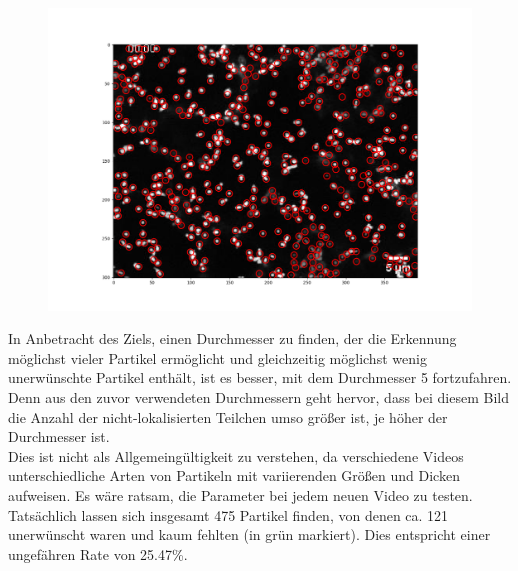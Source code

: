 \begin{enumerate}
\begin{figure}[H]
	\begin{minipage}{.5\textwidth}
     	\centering
  	  	\includegraphics[scale=0.3]{Grafiken/trackpyBilder/locate(frames[0], 5)_1.png}
 		 \label{fig:kap3_d=5}
    \end{minipage}
\end{figure}

In Anbetracht des Ziels, einen Durchmesser zu finden, der die Erkennung möglichst vieler Partikel ermöglicht und gleichzeitig möglichst wenig unerwünschte Partikel enthält, ist es besser, mit dem Durchmesser 5 fortzufahren. Denn aus den zuvor verwendeten Durchmessern geht hervor, dass bei diesem Bild die Anzahl der nicht-lokalisierten Teilchen umso größer ist, je höher der Durchmesser ist.\\ 
Dies ist nicht als Allgemeingültigkeit zu verstehen, da verschiedene Videos unterschiedliche Arten von Partikeln mit variierenden Größen und Dicken aufweisen. Es wäre ratsam, die Parameter bei jedem neuen Video zu testen.\\
Tatsächlich lassen sich insgesamt 475 Partikel finden, von denen ca. 121 unerwünscht waren und kaum fehlten (in grün markiert). Dies entspricht einer ungefähren Rate von 25.47\%.


\end{enumerate}
